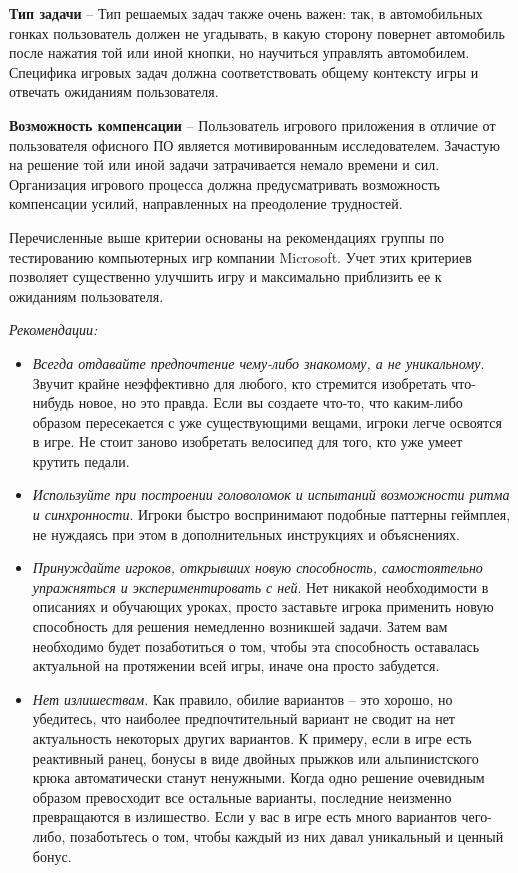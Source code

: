\documentclass{article}
\begin{document}
\textbf{Тип задачи} -- Тип решаемых задач также очень важен: так, в автомобильных гонках пользователь должен не угадывать, в какую сторону повернет автомобиль после нажатия той или иной кнопки, но научиться управлять автомобилем. Специфика игровых задач должна соответствовать общему контексту игры и отвечать ожиданиям пользователя.

\textbf{Возможность компенсации} -- Пользователь игрового приложения в отличие от пользователя офисного ПО является мотивированным исследователем. Зачастую на решение той или иной задачи затрачивается немало времени и сил. Организация игрового процесса должна предусматривать возможность компенсации усилий, направленных на преодоление трудностей.

\bigskip

Перечисленные выше критерии основаны на рекомендациях группы по тестированию компьютерных игр компании Microsoft. Учет этих критериев позволяет существенно улучшить игру и максимально приблизить ее к ожиданиям пользователя.

\bigskip

\noindent\textit{Рекомендации:}
\begin{itemize}
  \item \textit{Всегда отдавайте предпочтение чему-либо знакомому, а не уникальному}. Звучит крайне неэффективно для любого, кто стремится изобретать что-нибудь новое, но это правда. Если вы создаете что-то, что каким-либо образом пересекается с уже существующими вещами, игроки легче освоятся в игре. Не стоит заново изобретать велосипед для того, кто уже умеет крутить педали.
  \item \textit{Используйте при построении головоломок и испытаний возможности ритма и синхронности}. Игроки быстро воспринимают подобные паттерны геймплея, не нуждаясь при этом в дополнительных инструкциях и объяснениях.
  \item \textit{Принуждайте игроков, открывших новую способность, самостоятельно упражняться и экспериментировать с ней}. Нет никакой необходимости в описаниях и обучающих уроках, просто заставьте игрока применить новую способность для решения немедленно возникшей задачи. Затем вам необходимо будет позаботиться о том, чтобы эта способность оставалась актуальной на протяжении всей игры, иначе она просто забудется.
  \item \textit{Нет излишествам}. Как правило, обилие вариантов – это хорошо, но убедитесь, что наиболее предпочтительный вариант не сводит на нет актуальность некоторых других вариантов. К примеру, если в игре есть реактивный ранец, бонусы в виде двойных прыжков или альпинистского крюка автоматически станут ненужными. Когда одно решение очевидным образом превосходит все остальные варианты, последние неизменно превращаются в излишество. Если у вас в игре есть много вариантов чего-либо, позаботьтесь о том, чтобы каждый из них давал уникальный и ценный бонус.
\end{itemize}
\end{document}
